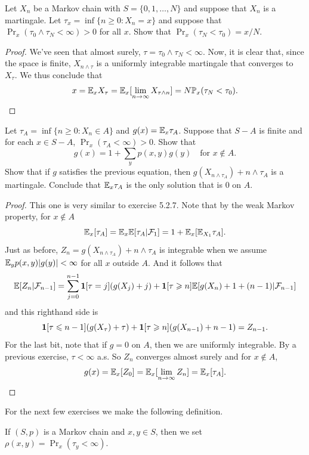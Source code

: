 \begin{exercise}[5.2.8]
	Let $X_n$ be a Markov chain with $S = \{0,1,\dots,N\}$ and suppose
	that $X_n$ is a martingale. Let $\tau_x = \inf\{n \geq 0: X_n = x\}$ and
	suppose that $\Pr_x(\tau_0 \land \tau_N < \infty) > 0$ for all $x$.
	Show that $\Pr_x(\tau_N < \tau_0) = x/N$.
\end{exercise}
\begin{proof}
	We've seen that almost surely, $\tau = \tau_0 \land \tau_N < \infty$. Now,
	it is clear that, since the space is finite, $X_{n \land \tau}$ is
	a uniformly integrable martingale that converges to $X_\tau$.
	We thus conclude that
	\[
		x = \mathbb{E}_x X_\tau = \mathbb{E}_x[\lim_{n \rightarrow \infty} X_{\tau \land n}] = N
		\mathbb{P}_x(\tau_N < \tau_0).
	\]
\end{proof}

\begin{exercise}[5.2.11]
	Let $\tau_A = \inf \{n \geq 0: X_n \in A\}$ and $g(x) = \mathbb{E}_x \tau_A$.
	Suppose that $S - A$ is finite and for each $x \in S-A$,
	$\Pr_x(\tau_A < \infty) > 0$. Show that
	\[
		g(x) = 1 + \sum_{y} p(x,y)g(y) \quad \text{for } x \not \in A.
	\]
	Show that if $g$ satisfies the previous equation, then
	$g(X_{n \land \tau_A}) + n \land \tau_A$ is a martingale.
	Conclude that $\mathbb{E}_x \tau_A$ is the only solution that is
	$0$ on $A$.
\end{exercise}
\begin{proof}
	This one is very similar to exercise 5.2.7. Note that by
	the weak Markov property, for $x \not \in A$
	\[
		\mathbb{E}_x[\tau_A] = \mathbb{E}_x\mathbb{E}[\tau_A|\mathcal{F}_1] = 1 + \mathbb{E}_x[\mathbb{E}_{X_1} \tau_A].
	\]
	Just as before, $Z_n = g(X_{n \land \tau_A}) + n \land \tau_A$ is integrable
	when we assume $\mathbb{E}_{y} p(x,y)|g(y)| < \infty$ for all $x$ outside $A$.
	And it follows that
	\[
		\mathbb{E}[Z_n | \mathcal{F}_{n-1}]
		= \sum_{j = 0}^{n-1}\bm{1}[\tau = j](g(X_j) + j) + \bm{1}[\tau \geqslant
		n]\mathbb{E}[g(X_n) + 1 + (n-1)|\mathcal{F}_{n-1}]
	\]
	and this righthand side is
	\[
		\bm{1}[\tau \leqslant n - 1](g(X_\tau) + \tau) + \bm{1}[\tau \geqslant
		n](g(X_{n-1}) + n-1) = Z_{n-1}.
	\]
	For the last bit, note that if $g = 0$ on $A$, then we are
	uniformly integrable.
	By a previous exercise, $\tau < \infty$ a.s. So $Z_n$ converges almost surely
	and for $x \not \in A$,
	\[
		g(x) = \mathbb{E}_x[Z_0] = \mathbb{E}_x[\lim_{n \rightarrow \infty} Z_n] = \mathbb{E}_x[\tau_A].
	\]
\end{proof}

For the next few exercises we make the following definition.
\begin{definition}
	If $(S,p)$ is a Markov chain and $x,y \in S$, then we set $\rho(x,
	y) = \Pr_x(\tau_y < \infty)$.
\end{definition}

